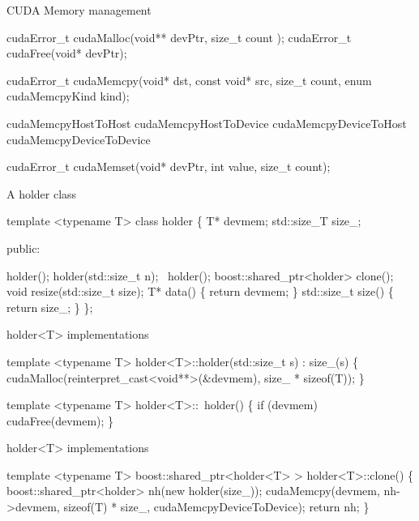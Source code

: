 \documentclass[10pt]{beamer}
\begin{document}

\begin{frame}[fragile]{CUDA Memory management}
  \begin{semiverbatim}
cudaError_t cudaMalloc(void** devPtr, size_t count );
cudaError_t cudaFree(void* devPtr);

cudaError_t cudaMemcpy(void* dst, const void* src, 
                       size_t count, 
                       enum cudaMemcpyKind kind);

cudaMemcpyHostToHost
cudaMemcpyHostToDevice
cudaMemcpyDeviceToHost
cudaMemcpyDeviceToDevice

cudaError_t cudaMemset(void* devPtr, int value, 
                       size_t count);
  \end{semiverbatim}
\end{frame}


\begin{frame}[fragile]{A holder class}
  \begin{semiverbatim}template <typename T>
class holder
\{
    T* devmem;
    std::size_T size_;

  public:

    holder();
    holder(std::size_t n);
    ~holder();
    boost::shared_ptr<holder> clone();
    void resize(std::size_t size);
    T* data() \{ return devmem; \}
    std::size_t size() \{ return size_; \}
\};
\end{semiverbatim}
\end{frame}

\begin{frame}[fragile]{holder<T> implementations}
\begin{semiverbatim}template <typename T>
holder<T>::holder(std::size_t s) : size_(s)
\{
   cudaMalloc(reinterpret_cast<void**>(&devmem), 
              size_ * sizeof(T));
\}

template <typename T>
holder<T>::~holder()
\{
  if (devmem)
    cudaFree(devmem);
\}
  \end{semiverbatim}
\end{frame}

\begin{frame}[fragile]{holder<T> implementations}
\begin{semiverbatim}template <typename T>
boost::shared_ptr<holder<T> >
holder<T>::clone()
\{
   boost::shared_ptr<holder> nh(new holder(size_));
   cudaMemcpy(devmem, nh->devmem,
              sizeof(T) * size_,
              cudaMemcpyDeviceToDevice);       
   return nh;
\}
  \end{semiverbatim}
\end{frame}
\end{document}
